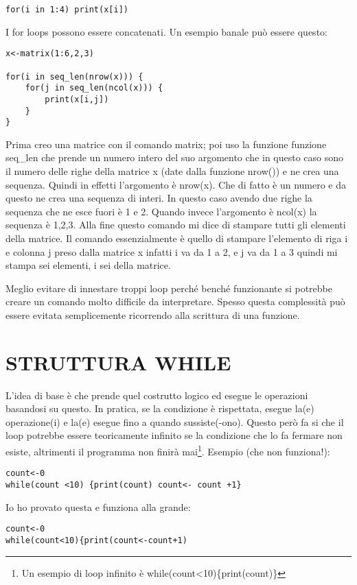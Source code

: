 \begin{lstlisting}
for(i in 1:4) print(x[i])
\end{lstlisting}

I for loops possono essere concatenati.
Un esempio banale può essere questo:

\begin{lstlisting}
x<-matrix(1:6,2,3)

for(i in seq_len(nrow(x))) {
	for(j in seq_len(ncol(x))) {
		print(x[i,j])
	}
}
\end{lstlisting}

Prima creo una matrice con il comando matrix; poi uso la funzione funzione seq\_len che prende un numero intero del suo argomento che in questo caso sono il numero delle righe della matrice x (date dalla funzione nrow()) e ne crea una sequenza. Quindi in effetti l'argomento è nrow(x). Che di fatto è un numero e da questo ne crea
una sequenza di interi. In questo caso avendo due righe la sequenza che ne esce fuori è
1 e 2.
Quando invece l'argomento è ncol(x) la sequenza è 1,2,3.
Alla fine questo comando mi dice di stampare tutti gli elementi della matrice.
Il comando essenzialmente è quello di stampare l'elemento di riga i e colonna j preso
dalla matrice x infatti i va da 1 a 2, e j va da 1 a 3 quindi mi stampa sei elementi, i sei della matrice.

Meglio evitare di innestare troppi loop perché benché funzionante si potrebbe creare un comando molto difficile da interpretare. Spesso questa complessità può essere evitata semplicemente ricorrendo alla scrittura di una funzione.

\section{STRUTTURA WHILE}

L'idea di base è che \erre prende quel costrutto logico ed esegue le operazioni basandosi su questo.
In pratica, se la condizione è rispettata, \erre esegue la(e) operazione(i) e la(e) esegue fino a quando sussiste(-ono). Questo però
fa si che il loop potrebbe essere teoricamente infinito se la condizione che lo fa fermare
non esiste, altrimenti il programma non finirà mai\footnote{Un esempio di loop infinito è while(count<10)\{print(count)\} }.
Esempio (che non funziona!):

\begin{lstlisting}
count<-0
while(count <10) {print(count) count<- count +1}
\end{lstlisting}
Io ho provato questa e funziona alla grande:
\begin{lstlisting}
count<-0
while(count<10){print(count<-count+1)
\end{lstlisting}

